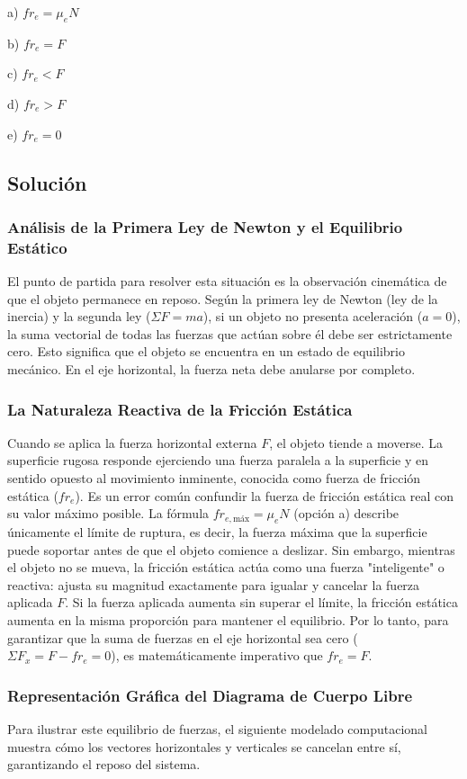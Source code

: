 \documentclass[12pt]{article}
\begin{document}
a) $fr_e = \mu_e N$

b) $fr_e = F$

c) $fr_e < F$

d) $fr_e > F$

e) $fr_e = 0$

\subsection*{Solución}

\subsubsection*{Análisis de la Primera Ley de Newton y el Equilibrio Estático}
El punto de partida para resolver esta situación es la observación cinemática de que el objeto permanece en reposo. Según la primera ley de Newton (ley de la inercia) y la segunda ley ($\Sigma F = ma$), si un objeto no presenta aceleración ($a = 0$), la suma vectorial de todas las fuerzas que actúan sobre él debe ser estrictamente cero. Esto significa que el objeto se encuentra en un estado de equilibrio mecánico. En el eje horizontal, la fuerza neta debe anularse por completo.

\subsubsection*{La Naturaleza Reactiva de la Fricción Estática}
Cuando se aplica la fuerza horizontal externa $F$, el objeto tiende a moverse. La superficie rugosa responde ejerciendo una fuerza paralela a la superficie y en sentido opuesto al movimiento inminente, conocida como fuerza de fricción estática ($fr_e$). 
Es un error común confundir la fuerza de fricción estática real con su valor máximo posible. La fórmula $fr_{e,\text{máx}} = \mu_e N$ (opción a) describe únicamente el límite de ruptura, es decir, la fuerza máxima que la superficie puede soportar antes de que el objeto comience a deslizar. Sin embargo, mientras el objeto no se mueva, la fricción estática actúa como una fuerza "inteligente" o reactiva: ajusta su magnitud exactamente para igualar y cancelar la fuerza aplicada $F$. Si la fuerza aplicada aumenta sin superar el límite, la fricción estática aumenta en la misma proporción para mantener el equilibrio. Por lo tanto, para garantizar que la suma de fuerzas en el eje horizontal sea cero ($\Sigma F_x = F - fr_e = 0$), es matemáticamente imperativo que $fr_e = F$.

\subsubsection*{Representación Gráfica del Diagrama de Cuerpo Libre}
Para ilustrar este equilibrio de fuerzas, el siguiente modelado computacional muestra cómo los vectores horizontales y verticales se cancelan entre sí, garantizando el reposo del sistema.
\end{document}
